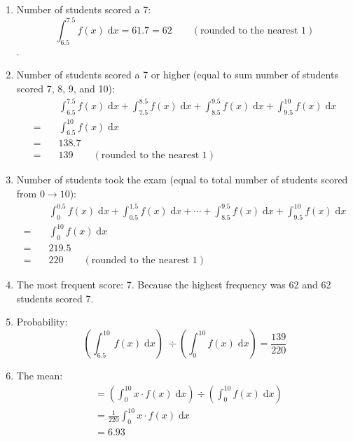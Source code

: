 \documentclass[12pt]{article}
\begin{document}
\begin{enumerate}
    \item Number of students scored a 7: $$\int_{6.5}^{7.5} f(x)\;\mathrm{d}x = 61.7=62
    \qquad (\text{rounded to the nearest 1})$$. \par

    \item Number of students scored a 7 or higher (equal to sum number of students scored 7, 8, 9, and 10): 
    \begin{align*}
        &\int_{6.5}^{7.5} f(x)\;\mathrm{d}x 
        + \int_{7.5}^{8.5} f(x)\;\mathrm{d}x
        + \int_{8.5}^{9.5} f(x)\;\mathrm{d}x
        + \int_{9.5}^{10} f(x)\;\mathrm{d}x \\
        =\quad& \int_{6.5}^{10} f(x)\;\mathrm{d}x \\
        =\quad& 138.7 \\
        =\quad& 139 \qquad (\text{rounded to the nearest 1})
    \end{align*}

    \item Number of students took the exam (equal to total number of students scored from $0\to 10$):
    \begin{align*}
        &\int_{0}^{0.5} f(x)\;\mathrm{d}x 
        + \int_{0.5}^{1.5} f(x)\;\mathrm{d}x 
        +\cdots
        + \int_{8.5}^{9.5} f(x)\;\mathrm{d}x
        + \int_{9.5}^{10} f(x)\;\mathrm{d}x \\
        =\quad&\int_{0}^{10} f(x)\;\mathrm{d}x \\
        =\quad& 219.5 \\
        =\quad& 220 \qquad (\text{rounded to the nearest 1})
    \end{align*}
        
        
    \item The most frequent score: 7. Because the highest frequency was 62 and 62 students scored 7.
        
    \item Probability:
    $$\left(\int_{6.5}^{10} f(x)\;\mathrm{d}x \right) 
    \;\div 
    \left(\int_{0}^{10} f(x)\;\mathrm{d}x \right)
    = \frac{139}{220}$$

        
    \item The mean:
    \begin{align*}
        &=\left( \int_0^{10}x\cdot f(x) \;\mathrm{d} x\right)
        \div
        \left(\int_0^{10} f(x) \;\mathrm{d}x \right) \\
        &= \frac{1}{220} \int_0^{10}x\cdot f(x) \;\mathrm{d}x \\
        &= 6.93
    \end{align*}
        


\end{enumerate}
\end{document}
